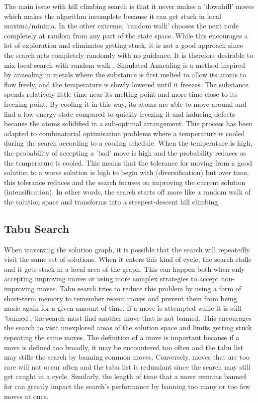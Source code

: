 The main issue with hill climbing search is that it never makes a 'downhill' moves which makes the algorithm incomplete because it can get stuck in local maxima/minima. In the other extreme, 'random walk' chooses the next node completely at random from any part of the state space. While this encourages a lot of exploration and eliminates getting stuck, it is not a good approach since the search acts completely randomly with no guidance. It is therefore desirable to mix local search with random walk \citep{russell2016artificial}. Simulated Annealing \citep{kirkpatrick1983optimization} is a method inspired by annealing in metals where the substance is first melted to allow its atoms to flow freely, and the temperature is slowly lowered until it freezes. The substance spends relatively little time near its melting point and more time close to its freezing point. By cooling it in this way, its atoms are able to move around and find a low-energy state compared to quickly freezing it and inducing defects because the atoms solidified in a sub-optimal arrangement. This process has been adapted to combinatorial optimisation problems where a temperature is cooled during the search according to a cooling schedule. When the temperature is high, the probability of accepting a 'bad' move is high and the probability reduces as the temperature is cooled. This means that the tolerance for moving from a good solution to a worse solution is high to begin with (diversification) but over time, this tolerance reduces and the search focuses on improving the current solution (intensification). In other words, the search starts off more like a random walk of the solution space and transforms into a steepest-descent hill climbing.

\subsection{Tabu Search}

When traversing the solution graph, it is possible that the search will repeatedly visit the same set of solutions. When it enters this kind of cycle, the search stalls and it gets stuck in a local area of the graph. This can happen both when only accepting improving moves or using more complex strategies to accept non-improving moves. Tabu search \citep{glover1989tabu} tries to reduce this problem by using a form of short-term memory to remember recent moves and prevent them from being made again for a given amount of time. If a move is attempted while it is still 'banned', the search must find another move that is not banned. This encourages the search to visit unexplored areas of the solution space and limits getting stuck repeating the same moves. The definition of a move is important because if a move is defined too broadly, it may be encountered too often and the tabu list may stifle the search by banning common moves. Conversely, moves that are too rare will not occur often and the tabu list is redundant since the search may still get caught in a cycle. Similarly, the length of time that a move remains banned for can greatly impact the search's performance by banning too many or too few moves at once.



